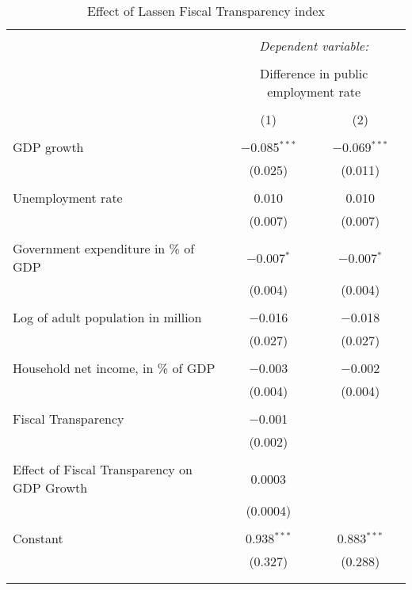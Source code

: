 
\begin{table}[!htbp] \centering 
  \caption{Effect of Lassen Fiscal Transparency index} 
  \label{} 
\begin{tabular}{@{\extracolsep{5pt}}lcc} 
\\[-1.8ex]\hline 
\hline \\[-1.8ex] 
 & \multicolumn{2}{c}{\textit{Dependent variable:}} \\ 
\cline{2-3} 
\\[-1.8ex] & \multicolumn{2}{c}{Difference in public employment rate} \\ 
\\[-1.8ex] & (1) & (2)\\ 
\hline \\[-1.8ex] 
 GDP growth & $-$0.085$^{***}$ & $-$0.069$^{***}$ \\ 
  & (0.025) & (0.011) \\ 
  & & \\ 
 Unemployment rate & 0.010 & 0.010 \\ 
  & (0.007) & (0.007) \\ 
  & & \\ 
 Government expenditure in \% of GDP & $-$0.007$^{*}$ & $-$0.007$^{*}$ \\ 
  & (0.004) & (0.004) \\ 
  & & \\ 
 Log of adult population in million & $-$0.016 & $-$0.018 \\ 
  & (0.027) & (0.027) \\ 
  & & \\ 
 Household net income, in \% of GDP & $-$0.003 & $-$0.002 \\ 
  & (0.004) & (0.004) \\ 
  & & \\ 
 Fiscal Transparency & $-$0.001 &  \\ 
  & (0.002) &  \\ 
  & & \\ 
 Effect of Fiscal Transparency on GDP Growth & 0.0003 &  \\ 
  & (0.0004) &  \\ 
  & & \\ 
 Constant & 0.938$^{***}$ & 0.883$^{***}$ \\ 
  & (0.327) & (0.288) \\ 
  & & \\ 
\hline \\[-1.8ex] 

\end{tabular}
\end{table}
